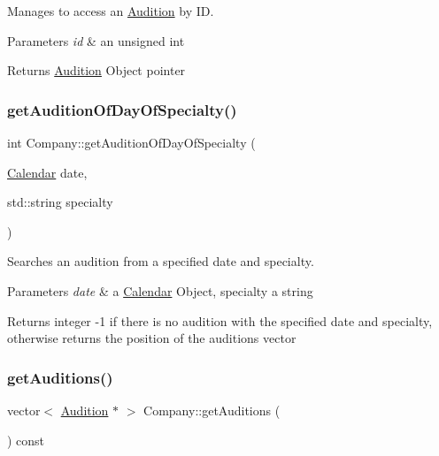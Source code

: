 Manages to access an \hyperlink{class_audition}{Audition} by ID. 


\begin{DoxyParams}{Parameters}
{\em id} & an unsigned int \\
\hline
\end{DoxyParams}
\begin{DoxyReturn}{Returns}
\hyperlink{class_audition}{Audition} Object pointer 
\end{DoxyReturn}
\mbox{\label{class_company_ad0f12e0fa92a28869aac46fde4b304c8}} 
\subsubsection{\texorpdfstring{get\+Audition\+Of\+Day\+Of\+Specialty()}{getAuditionOfDayOfSpecialty()}}
{\footnotesize\ttfamily int Company\+::get\+Audition\+Of\+Day\+Of\+Specialty (\begin{DoxyParamCaption}\item[{\hyperlink{class_calendar}{Calendar}}]{date,  }\item[{std\+::string}]{specialty }\end{DoxyParamCaption})}



Searches an audition from a specified date and specialty. 


\begin{DoxyParams}{Parameters}
{\em date} & a \hyperlink{class_calendar}{Calendar} Object, specialty a string \\
\hline
\end{DoxyParams}
\begin{DoxyReturn}{Returns}
integer -\/1 if there is no audition with the specified date and specialty, otherwise returns the position of the auditions vector 
\end{DoxyReturn}
\mbox{\label{class_company_a9d2d2e8bdad7bccc57324100de3c3e5b}} 
\subsubsection{\texorpdfstring{get\+Auditions()}{getAuditions()}}
{\footnotesize\ttfamily vector$<$ \hyperlink{class_audition}{Audition} $\ast$ $>$ Company\+::get\+Auditions (\begin{DoxyParamCaption}{ }\end{DoxyParamCaption}) const}



